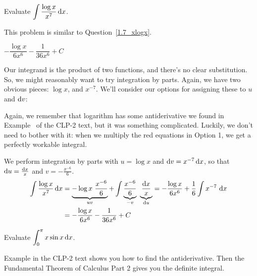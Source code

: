 \begin{question}[M105 2013A]\label{1.7_xlogx2}
Evaluate ${\displaystyle\int \frac{\log x}{x^7}\,\mathrm{d}x}$.
\end{question}

\begin{hint}
This problem is similar to Question~\ref{1.7_xlogx}.
\end{hint}

\begin{answer}
$- \dfrac{\log x}{6 x^6} - \dfrac{1}{36 x^6} + C$
\end{answer}

\begin{solution}
Our integrand is the product of two functions, and there's no clear substitution. So, we might reasonably want to try integration by parts. Again, we have two obvious pieces: $\log x$, and $x^{-7}$. We'll consider our options for assigning these to $u$ and $\mathrm{d}v$:


Again, we remember that logarithm has some antiderivative we found in Example~ of the CLP-2 text, but it was something complicated. Luckily, we don't need to bother with it: when we multiply the red equations in Option 1, we get a perfectly workable integral.

We perform integration by parts with $u=\log x$ and $\mathrm{d}v=x^{-7}\,\mathrm{d}x$,
so that $\mathrm{d}u=\frac{\mathrm{d}x}{x}$ and $v = -\frac{x^{-6}}{6}$.
\begin{align*}
\int \frac{\log x}{x^7}\,\dee{x}
   &=\underbrace{ -\log x\ \frac{x^{-6}}{6}}_{uv} + \int \underbrace{\frac{x^{-6}}{6}}_{-v}\ \underbrace{\frac{\dee{x}}{x}}_{\dee{u}}
    = - \frac{\log x}{6 x^6} +\frac{1}{6} \int x^{-7} \ \dee{x} \\
   &= - \frac{\log x}{6 x^6} - \frac{1}{36 x^6} + C
\end{align*}
\end{solution}

\begin{Mquestion}[2016A]\label{1.7_xsinx}
Evaluate $\displaystyle\int_0^\pi x\sin x\,\mathrm{d}x$.
\end{Mquestion}

\begin{hint}
 Example  in the
CLP-2 text shows you how to find the antiderivative. Then the Fundamental Theorem of Calculus Part 2 gives you the definite integral.
\end{hint}

